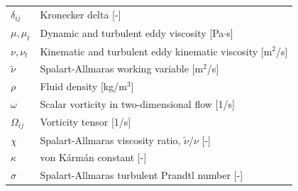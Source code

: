 \documentclass[master=ewtk,masteroption=,openany]{kulemt}
\begin{document}
\begin{flushleft}
\begin{tabularx}{\textwidth}{@{}p{35mm}X@{}}
		$\delta_{ij}$ & Kronecker delta [-] \\
		$\mu, \mu_t$ & Dynamic and turbulent eddy viscosity [Pa$\cdot$s] \\
		$\nu, \nu_t$ & Kinematic and turbulent eddy kinematic viscosity [m$^2$/s] \\
		$\tilde{\nu}$ & Spalart-Allmaras working variable [m$^2$/s] \\
		$\rho$ & Fluid density [kg/m$^3$] \\
		$\omega$ & Scalar vorticity in two-dimensional flow [1/s] \\
			$\Omega_{ij}$ & Vorticity tensor [1/s] \\
			$\chi$ & Spalart-Allmaras viscosity ratio, $\tilde{\nu}/\nu$ [-] \\
			$\kappa$ & von Kármán constant [-] \\
			$\sigma$ & Spalart-Allmaras turbulent Prandtl number [-] \\
		\end{tabularx}
	\end{flushleft}
\end{document}
